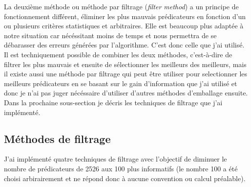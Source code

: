 La deuxième méthode ou méthode par filtrage (\textit{filter method}) a un principe de fonctionnement différent, éliminer les plus mauvais prédicateurs en fonction d'un ou plusieurs critères statistiques et arbitraires. Elle est beaucoup plus adaptée à notre situation car nécéssitant moins de temps et nous permettra de se débarasser des erreurs générées par l'algorithme. C'est donc celle que j'ai utilisé. Il est techniquement possible de combiner les deux méthodes, c'est-à-dire de filtrer les plus mauvais et ensuite de sélectionner les meilleurs des meilleurs, mais il existe aussi une méthode par filtrage qui peut être utiliser pour selectionner les meilleurs prédicateurs en se basant sur le gain d'information que j'ai utilisé et donc je n'ai pas juger nécéssaire d'utiliser d'autres méthodes d'emballage ensuite. Dans la prochaine sous-section je décris les techniques de filtrage que j'ai implémenté.

\subsection{Méthodes de filtrage}
\label{chap3.sec2.sub1}
J'ai implémenté quatre techniques de filtrage avec l'objectif de diminuer le nombre de prédicateurs de 2526 aux 100 plus informatifs (le nombre 100 a été choisi arbirairement et ne répond donc à aucune convention ou calcul préalable).


